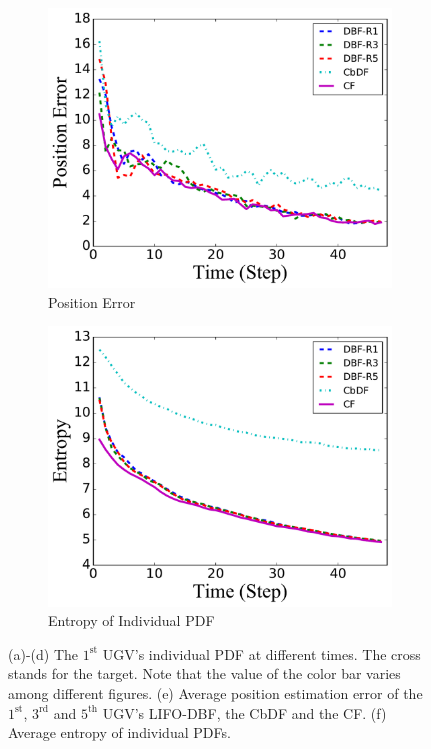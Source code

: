 \documentclass[journal]{IEEEtranTIE}
\theoremstyle{remark}
\begin{document}
\begin{figure}
\begin{subfigure}[b]{0.21\textwidth}
			\includegraphics[width=\textwidth]{brg_sta_sen_sta_tar_pos_err_16-TIE-3798}
			\caption{Position Error}\label{fig:sta_sen_sta_tar_pos_err}
		\end{subfigure}
		\begin{subfigure}[b]{0.21\textwidth}
			\includegraphics[width=\textwidth]		{brg_sta_sen_sta_tar_entropy_16-TIE-3798}%
			\caption{Entropy of Individual PDF}\label{fig:sta_sen_sta_tar_entropy}
		\end{subfigure}
		\caption{(a)-(d) The $1^\text{st}$ UGV's individual PDF at different times. 
			The cross stands for the target. Note that the value of the color bar varies among different figures. (e) Average position estimation error of the $1^\text{st}$, $3^\text{rd}$ and $5^\text{th}$ UGV's LIFO-DBF, the CbDF and the CF. (f) Average entropy of individual PDFs.}
		\label{fig:sta_sen_sta_tar}
		\vspace{-1em}
	\end{figure}
	
\end{document}
